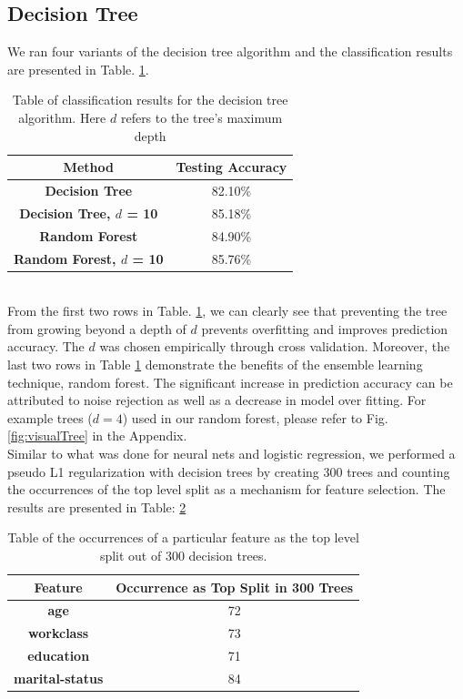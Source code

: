 \documentclass[conference]{IEEEtran}
\begin{document}
\subsection{Decision Tree}
We ran four variants of the decision tree algorithm and the classification results are presented in Table. \ref{table:treesResults}.
\begin{table}[h]
\centering
\begin{tabular}{|c|c|}
\hline
\textbf{Method} & \textbf{Testing Accuracy} \\ \hline
\textbf{Decision Tree} & 82.10\% \\ \hline
\textbf{Decision Tree, $d$ = 10} & 85.18\% \\ \hline
\textbf{Random Forest} & 84.90\% \\ \hline
\textbf{Random Forest, $d$ = 10} & 85.76\% \\ \hline
\end{tabular}
\caption{Table of classification results for the decision tree algorithm. Here $d$ refers to the tree's maximum depth}
\label{table:treesResults}
\end{table} \\
From the first two rows in Table. \ref{table:treesResults}, we can clearly see that preventing the tree from growing beyond a depth of $d$ prevents overfitting and improves prediction accuracy. The $d$ was chosen empirically through cross validation. Moreover, the last two rows in Table \ref{table:treesResults} demonstrate the benefits of the ensemble learning technique, random forest. The significant increase in prediction accuracy can be attributed to noise rejection as well as a decrease in model over fitting. For example trees ($d=4$) used in our random forest, please refer to Fig. \ref{fig:visualTree} in the Appendix. \\
Similar to what was done for neural nets and logistic regression, we performed a pseudo L1 regularization with decision trees by creating 300 trees and counting the occurrences of the top level split as a mechanism for feature selection. The results are presented in Table: \ref{table:occurTree}
\begin{table}[h]
\centering
\begin{tabular}{|c|c|}
\hline
\textbf{Feature} & \textbf{Occurrence as Top Split in 300 Trees} \\ \hline
\textbf{age} & 72 \\ \hline
\textbf{workclass} & 73 \\ \hline
\textbf{education} & 71 \\ \hline
\textbf{marital-status} & 84 \\ \hline
\end{tabular}
\caption{Table of the occurrences of a particular feature as the top level split out of 300 decision trees.}
\label{table:occurTree}
\end{table}
\end{document}
